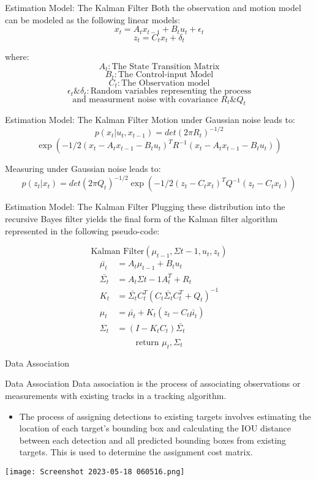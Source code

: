 \documentclass{beamer}
\begin{document}
\begin{frame}[t]{Estimation Model: The Kalman Filter}
Both the observation and motion model can be modeled as the following linear models:
	$$x_t = A_t x_{t-1} + B_t u_t + \epsilon_t$$
	$$z_t = C_t x_t + \delta_t$$
	
	where:
	$$A_t: \textrm{The State Transition Matrix}$$
	$$B_t: \textrm{The Control-input Model}$$
	$$C_t: \textrm{The Observation model}$$
	$$\epsilon_t \& \delta_t: \textrm{Random variables representing the process}$$
	$$ \textrm{and measurment noise with covariance } R_t \& Q_t$$
\end{frame}

\begin{frame}[t]{Estimation Model: The Kalman Filter}
	Motion under Gaussian noise leads to:
	$$p(x_t | u_t, x_{t-1}) = det(2\pi R_t)^{-1/2}$$
	$$ \exp \left( -1/2 (x_t - A_t x_{t-1} - B_t u_t)^T R^{-1} (x_t - A_t x_{t-1} - B_t u_t) \right)$$
	
	Measuring under Gaussian noise leads to:
	$$p(z_t | x_t) = det(2\pi Q_t)^{-1/2} \exp \left( -1/2 (z_t - C_t x_t)^T Q^{-1} (z_t - C_t x_t) \right)$$
\end{frame}

\begin{frame}[t]{Estimation Model: The Kalman Filter}
Plugging these distribution into the recursive Bayes filter yields the final form of the Kalman filter algorithm represented in the following pseudo-code:

$$\textrm{Kalman Filter}(\mu_{t-1}, \Sigma{t-1}, u_t, z_t)$$
\begin{align*}
\bar{\mu_t} &= A_t \mu_{t-1} + B_t u_t\\
\bar{\Sigma_t} &= A_t \Sigma{t-1} A_t^T + R_t\\
K_t &= \bar{\Sigma_t} C_t^T \left( C_t\bar{\Sigma_t} C_t^T + Q_t \right)^{-1}\\
\mu_t &= \bar{\mu_t} + K_t (z_t - C_t\bar{\mu_t})\\
\Sigma_t &= \left( I - K_tC_t \right)\bar{\Sigma_t}\\
\end{align*}	
$$\textrm{return } \mu_t, \Sigma_t$$
\end{frame}

\begin{frame}[t]{Data Association}
\begin{block}{Data Association}
Data association is the process of associating observations or measurements with existing tracks in a tracking algorithm.
\end{block}
\begin{itemize}
\item The process of assigning detections to existing targets involves estimating the location of each target's bounding box and calculating the IOU distance between each detection and all predicted bounding boxes from existing targets. This is used to determine the assignment cost matrix.
\end{itemize}
\begin{center}
\texttt{[image: Screenshot 2023-05-18 060516.png]}
\end{center}
\end{frame}
\end{document}
